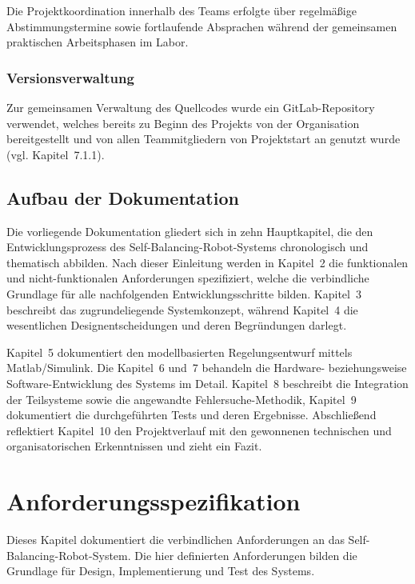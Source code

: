 \documentclass[12pt,ngerman,numbers=noenddot,abstracton,headsepline]{scrreprt}
\begin{document}
Die Projektkoordination innerhalb des Teams erfolgte über regelmäßige Abstimmungstermine sowie fortlaufende Absprachen während der gemeinsamen praktischen Arbeitsphasen im Labor.

\subsection{Versionsverwaltung}
\label{subsec:versionsverwaltung}

Zur gemeinsamen Verwaltung des Quellcodes wurde ein GitLab-Repository verwendet, welches bereits zu Beginn des Projekts von der Organisation bereitgestellt und von allen Teammitgliedern von Projektstart an genutzt wurde (vgl. Kapitel~7.1.1).

\section{Aufbau der Dokumentation}
\label{sec:aufbau_dokumentation}

Die vorliegende Dokumentation gliedert sich in zehn Hauptkapitel, die den Entwicklungsprozess des Self-Balancing-Robot-Systems chronologisch und thematisch abbilden. Nach dieser Einleitung werden in Kapitel~2 die funktionalen und nicht-funktionalen Anforderungen spezifiziert, welche die verbindliche Grundlage für alle nachfolgenden Entwicklungsschritte bilden. Kapitel~3 beschreibt das zugrundeliegende Systemkonzept, während Kapitel~4 die wesentlichen Designentscheidungen und deren Begründungen darlegt.

Kapitel~5 dokumentiert den modellbasierten Regelungsentwurf mittels Matlab/Simulink. Die Kapitel~6 und~7 behandeln die Hardware- beziehungsweise Software-Entwicklung des Systems im Detail. Kapitel~8 beschreibt die Integration der Teilsysteme sowie die angewandte Fehlersuche-Methodik, Kapitel~9 dokumentiert die durchgeführten Tests und deren Ergebnisse. Abschließend reflektiert Kapitel~10 den Projektverlauf mit den gewonnenen technischen und organisatorischen Erkenntnissen und zieht ein Fazit.

\chapter{Anforderungsspezifikation}
\label{ch:anforderungen}

Dieses Kapitel dokumentiert die verbindlichen Anforderungen an das Self-Balancing-Robot-System. Die hier definierten Anforderungen bilden die Grundlage für Design, Implementierung und Test des Systems.
\end{document}
